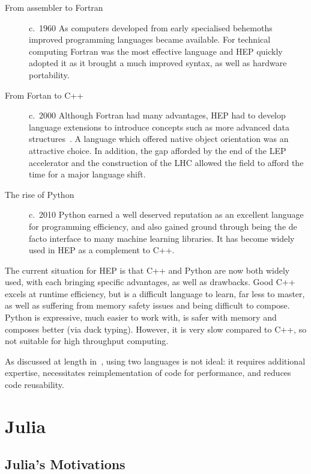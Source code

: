 \documentclass{webofc}
\begin{document}
\begin{description}
    \item[From assembler to Fortran] c.~1960 As computers developed from early
    specialised behemoths improved programming
    languages became available. For technical computing Fortran was the most
    effective language and HEP quickly adopted it as it brought a much improved
    syntax, as well as hardware portability.
    \item[From Fortan to C++] c.~2000 Although Fortran had many advantages, HEP had to
    develop language extensions to introduce concepts such as more advanced data
    structures~\cite{Zoll:2296399}. A language which offered native object
    orientation was an attractive choice. In addition, the gap afforded by the
    end of the LEP accelerator and the construction of the LHC allowed the field
    to afford the time for a major language shift.
    \item[The rise of Python] c.~2010 Python earned a well deserved reputation as an
    excellent language for programming efficiency, and also gained ground
    through being the de facto interface to many machine learning libraries. It
    has become widely used in HEP as a complement to C++.
\end{description}

The current situation for HEP is that C++ and Python are now both widely used,
with each bringing specific advantages, as well as drawbacks. Good C++ excels at
runtime efficiency, but is a difficult language to learn, far less to master, as well as
suffering from memory safety issues and being difficult to compose. Python is
expressive, much easier to work with, is safer with memory and composes better
(via duck typing). However, it is very slow compared to C++, so not suitable for
high throughput computing.

As discussed at length in~\cite{eschle2023potential}, using two languages is not ideal: it
requires additional expertise, necessitates reimplementation of code for
performance, and reduces code reusability.

\section{Julia}

\subsection{Julia's Motivations}
\end{document}
